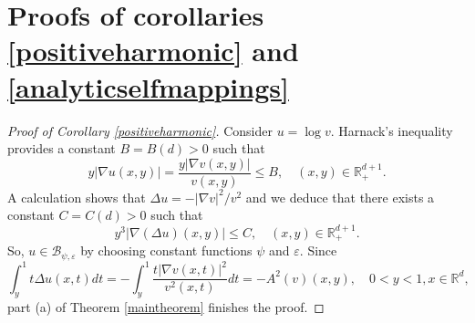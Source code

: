 \documentclass[11pt,letterpaper]{amsart}
\theoremstyle{definition}
\numberwithin{equation}{section}
\newcommand{\R}{\mathbb R}
\begin{document}
\section{Proofs of corollaries  \ref{positiveharmonic} and \ref{analyticselfmappings}}

\begin{proof}[Proof of Corollary \ref{positiveharmonic}]
Consider $u = \log v$. Harnack's inequality provides a constant $B=B(d)>0$ such that
$$
y |\nabla u (x,y)|= \frac{y |\nabla v(x,y)|}{v(x,y)} \leq B, \quad (x,y) \in \R_+^{d+1}. 
$$
A calculation shows that $\Delta u = - |\nabla v|^2 / v^2$ and we deduce that there exists a constant $C=C(d)>0$ such that
$$
y^3 |\nabla (\Delta u ) (x,y)| \leq C, \quad (x,y) \in \R_+^{d+1}. 
$$
So, $u \in \mathcal{B}_{\psi , \varepsilon }$  by choosing constant functions $\psi  $ and $\varepsilon$. Since
$$
\int_{y}^1 t \Delta u(x,t) dt= -  \int_y^1 \frac{t |\nabla v (x,t)|^2}{v^2 (x,t)} dt  = -  A^2 (v) (x,y)  , \quad 0<y<1, x \in \R^d,
$$
part (a) of Theorem \ref{maintheorem} finishes the proof. 
\end{proof}
\end{document}
